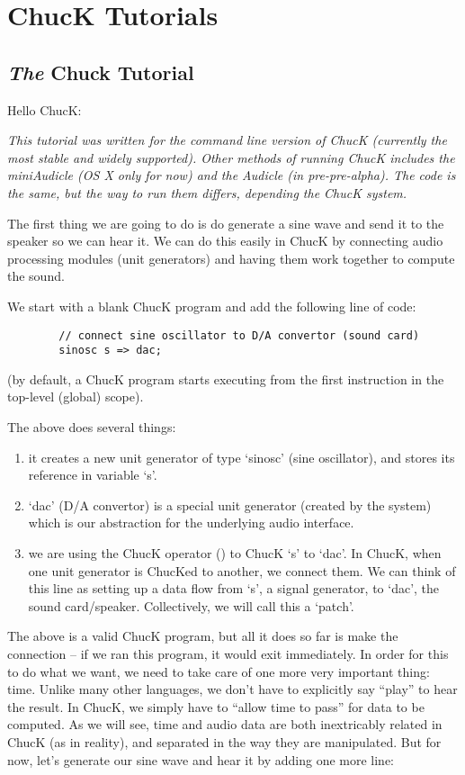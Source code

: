 \chapter{ChucK Tutorials}

\section{{\it The} Chuck Tutorial}
Hello ChucK: 

\textit{This tutorial was written for the command line version of ChucK (currently the most stable and widely supported).  Other methods of running ChucK includes the miniAudicle (OS X only for now) and the Audicle (in pre-pre-alpha).  The code is the same, but the way to run them differs, depending the ChucK system.}

The first thing we are going to do is do generate a sine wave and send it to the speaker so we can hear it. We can do this easily in ChucK by connecting audio processing modules (unit generators) and having them work together to compute the sound. 

We start with a blank ChucK program and add the following line of code:
\begin{verbatim}
        // connect sine oscillator to D/A convertor (sound card)
        sinosc s => dac;
\end{verbatim}
(by default, a ChucK program starts executing from the first instruction in the top-level (global) scope).

The above does several things:
\begin{enumerate}
\item it creates a new unit generator of type `sinosc' (sine oscillator), and stores its reference in variable `s'.
\item `dac' (D/A convertor) is a special unit generator (created by the system) which is our abstraction for the underlying audio interface.
\item we are using the ChucK operator (\chuckop) to ChucK `s' to `dac'. In ChucK, when one unit generator is ChucKed to another, we connect them. We can think of this line as setting up a data flow from `s', a signal generator, to `dac', the sound card/speaker. Collectively, we will call this a `patch'. 
\end{enumerate}

The above is a valid ChucK program, but all it does so far is make the connection -- if we ran this program, it would exit immediately. In order for this to do what we want, we need to take care of one more very important thing: time. Unlike many other languages, we don't have to explicitly say ``play'' to hear the result. In ChucK, we simply have to ``allow time to pass'' for data to be computed. As we will see, time and audio data are both inextricably related in ChucK (as in reality), and separated in the way they are manipulated. But for now, let's generate our sine wave and hear it by adding one more line:

